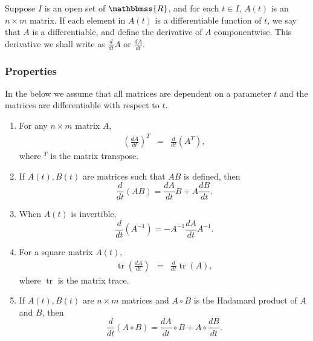 \documentclass[12pt]{article}
\newcommand{\R}{\mathbbmss{R}}
\begin{document}
Suppose $I$ is an open set of $\R$, and for each $t\in I$, $A(t)$ is 
an $n\times m$ matrix. If each element in $A(t)$ is a differentiable function 
of $t$, we say that $A$ is a differentiable, and define the 
derivative of $A$ componentwise. This derivative we shall write as
$\frac{d}{dt}A$ or $\frac{dA}{dt}$. 

\subsubsection*{Properties}
In the below we assume that all matrices are dependent on a parameter $t$
and the matrices are differentiable with respect to $t$. 
\begin{enumerate}
\item For any $n\times m$ matrix $A$,
\begin{eqnarray*}
   \left(\frac{dA}{dt}\right)^T &=& \frac{d}{dt}\left(A^T\right), 
\end{eqnarray*}
where $^T$ is the matrix transpose.
\item If $A(t),B(t)$ are matrices such that $AB$ is defined, then 
$$
   \frac{d}{dt}(AB) = \frac{dA}{dt} B + A\frac{dB}{dt}.
$$
\item When $A(t)$ is invertible,
$$
   \frac{d}{dt}(A^{-1}) = -A^{-1} \frac{dA}{dt} A^{-1}.
$$
\item For a square matrix $A(t)$, 
\begin{eqnarray*}
   \operatorname{tr}(\frac{dA}{dt}) &=& \frac{d}{dt}\operatorname{tr}(A),
\end{eqnarray*}
where $\operatorname{tr}$ is the matrix trace.
\item If $A(t),B(t)$ are $n\times m$ matrices and $A\circ B$ is the
Hadamard product of $A$ and $B$, then 
$$
   \frac{d}{dt}(A\circ B) = \frac{dA}{dt}\circ  B + A\circ \frac{dB}{dt}.
$$
\end{enumerate}
\end{document}

